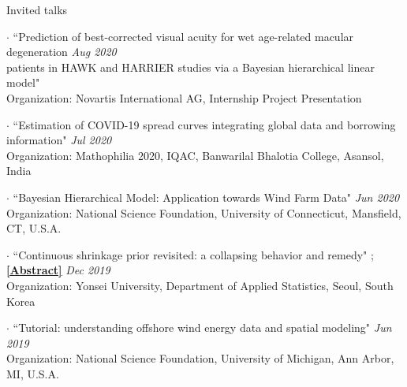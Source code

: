 \documentclass{resume} %
\begin{document}
\newpage
\begin{rSection}{Invited talks}
\item[$\cdot$]
{``Prediction of best-corrected visual acuity for wet age-related macular degeneration}  \hfill {\em Aug 2020}
\\
{ patients in HAWK and HARRIER studies via a Bayesian hierarchical linear model"}
\\
Organization: Novartis International AG, Internship Project Presentation

\item[$\cdot$]
{``Estimation of COVID-19 spread curves integrating global data and borrowing  information"}  \hfill {\em Jul 2020}
\\
Organization: Mathophilia 2020, IQAC, Banwarilal Bhalotia College, Asansol, India


\item[$\cdot$]
{``Bayesian Hierarchical Model: Application towards Wind
Farm Data"}  \hfill {\em Jun 2020}
\\
Organization: National Science Foundation, University of Connecticut, Mansfield, CT, U.S.A.

\item[$\cdot$]
{``Continuous shrinkage prior revisited: a collapsing behavior and remedy"}  
;
\href{https://stat.yonsei.ac.kr/stat/board/grad_notice.do?mode=view&articleNo=76831&article.offset=0&articleLimit=10}
{\underline{\textbf{[Abstract]}}}
\hfill {\em Dec 2019}
\\
Organization: Yonsei University, Department of Applied Statistics, Seoul, South Korea


\item[$\cdot$]
{``Tutorial: understanding offshore wind energy data and spatial modeling"}  \hfill {\em Jun 2019}
\\
Organization: National Science Foundation, University of Michigan, Ann Arbor, MI, U.S.A.
\end{rSection}
\end{document}
